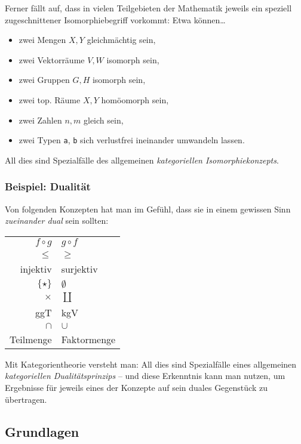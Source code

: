 \documentclass[a4paper,ngerman]{scrartcl}
\theoremstyle{definition}
\theoremstyle{plain}
\theoremstyle{remark}
\begin{document}
Ferner fällt auf, dass in vielen Teilgebieten der Mathematik jeweils ein
speziell zugeschnittener Isomorphiebegriff vorkommt: Etwa können\ldots
\begin{itemize}
  \item zwei Mengen $X,Y$ \tabto{4.63cm} gleichmächtig sein,
  \item zwei Vektorräume $V,W$ \tabto{4.63cm} isomorph sein,
  \item zwei Gruppen $G,H$ \tabto{4.63cm} isomorph sein,
  \item zwei top. Räume $X,Y$ \tabto{4.63cm} homöomorph sein,
  \item zwei Zahlen $n,m$ \tabto{4.63cm} gleich sein,
  \item zwei Typen \texttt{a}, \texttt{b} \tabto{4.63cm} sich verlustfrei ineinander umwandeln lassen.
\end{itemize}
All dies sind Spezialfälle des allgemeinen \emph{kategoriellen
Isomorphiekonzepts}.

\subsubsection*{Beispiel: Dualität}

Von folgenden Konzepten hat man im Gefühl, dass sie in einem gewissen Sinn
\emph{zueinander dual} sein sollten:
\begin{center}
  \setlength{\extrarowheight}{0.3em}
  \begin{tabular}{r|l}
    $f \circ g$ & $g \circ f$ \\
    $\leq$ & $\geq$ \\
    injektiv & surjektiv \\
    $\{\star\}$ & $\emptyset$ \\
    $\times$ & $\coprod$ \\
    ggT & kgV \\
    $\cap$ & $\cup$ \\
    Teilmenge & Faktormenge
  \end{tabular}
\end{center}
Mit Kategorientheorie versteht man: All dies sind Spezialfälle eines allgemeinen
\emph{kategoriellen Dualitätsprinzips} -- und diese Erkenntnis kann man nutzen,
um Ergebnisse für jeweils eines der Konzepte auf sein duales Gegenstück zu
übertragen.

\subsection{Grundlagen}
\end{document}
